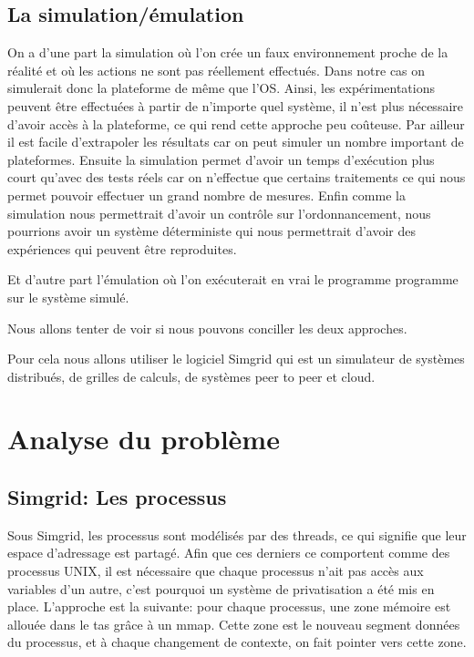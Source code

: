 \documentclass[smallextended]{svjour3}
\begin{document}
\subsection{La simulation/émulation}
\label{sec-2-3}
On a d'une part la simulation où l'on crée un faux environnement
proche de la réalité et où les actions ne sont pas réellement
effectués. Dans notre cas on simulerait donc la plateforme de même que l'OS. 
Ainsi, les expérimentations peuvent être effectuées à
partir de n'importe quel système, il n'est plus nécessaire d'avoir
accès à la plateforme, ce qui rend cette approche peu
coûteuse. 
Par ailleur il est facile d'extrapoler les résultats car
on peut simuler un nombre important de plateformes.  
Ensuite la simulation permet d'avoir un temps d'exécution plus
court qu'avec des tests réels car on n'effectue que certains 
traitements ce qui nous permet pouvoir effectuer un grand nombre
de mesures.  
Enfin comme la simulation nous permettrait d'avoir un contrôle sur
l'ordonnancement, nous pourrions avoir un système déterministe qui
nous permettrait d'avoir des expériences qui peuvent être reproduites.

Et d'autre part l'émulation où l'on exécuterait en vrai le programme
programme sur le système simulé. 

Nous allons tenter de voir si nous pouvons conciller les deux approches.

Pour cela nous allons utiliser le logiciel Simgrid qui est un simulateur
de systèmes distribués, de grilles de calculs, de systèmes peer to
peer et cloud.

\section{Analyse du problème}
\label{sec-3}
\subsection{Simgrid: Les processus}
\label{sec-3-1}
Sous Simgrid, les processus sont modélisés par des threads, ce
qui signifie que leur espace d'adressage est partagé.
Afin que ces derniers ce comportent comme des processus UNIX, il
est nécessaire que chaque processus n'ait pas accès aux
variables d'un autre, c'est pourquoi un système de
privatisation a été mis en place. L'approche est la suivante:
pour chaque processus, une zone mémoire est allouée dans le
tas grâce à un mmap. Cette zone est le nouveau segment données du
processus, et à chaque changement de contexte, on fait pointer
vers cette zone. 
\end{document}
